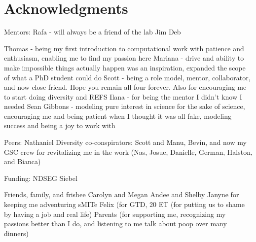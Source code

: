 \cleardoublepage
\setcounter{savepage}{\thepage}
\begin{abstractpage}

\end{abstractpage}

\cleardoublepage

\section*{Acknowledgments}

Mentors:
Rafa - will always be a friend of the lab
Jim
Deb

Thomas - being my first introduction to computational work with patience and enthusiasm, enabling me to find my passion here
Mariana - drive and ability to make impossible things actually happen was an inspiration, expanded the scope of what a PhD student could do
Scott - being a role model, mentor, collaborator, and now close friend. Hope you remain all four forever. Also for encouraging me to start doing diversity and REFS
Ilana - for being the mentor I didn't know I needed
Sean Gibbons - modeling pure interest in science for the sake of science, encouraging me and being patient when I thought it was all fake, modeling success and being a joy to work with

Peers:
Nathaniel
Diversity co-conspirators: Scott and Manu, Bevin, and now my GSC crew for revitalizing me in the work (Nas, Josue, Danielle, German, Halston, and Bianca)

Funding:
NDSEG
Siebel

Friends, family, and frisbee
Carolyn and Megan
Andee and Shelby
Janyne for keeping me adventuring
sMITe
Felix (for GTD, 20%
ET (for putting us to shame by having a job and real life)
Parents (for supporting me, recognizing my passions better than I do, and listening to me talk about poop over many dinners)
